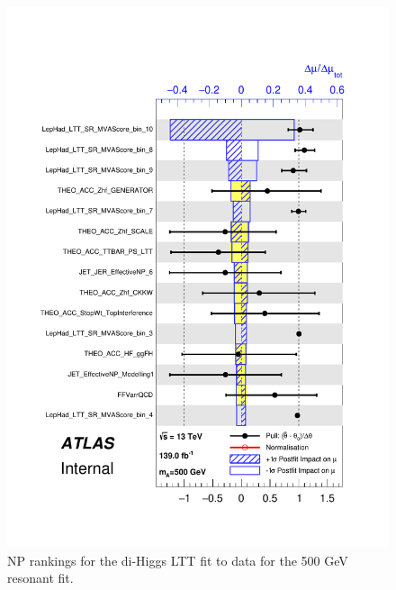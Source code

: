    \begin{figure}
   \centering
   \includegraphics[width=.8\textwidth]{figures/results/HH/LepHad/pulls_SigXsecOverSM_500_LTT.pdf}
   \caption{NP rankings for the di-Higgs \lephad LTT fit to data for the 500 GeV resonant fit.}
   \label{fig:LepHadPostfitNPRankings2HDM500LTT}
   \end{figure}
   
